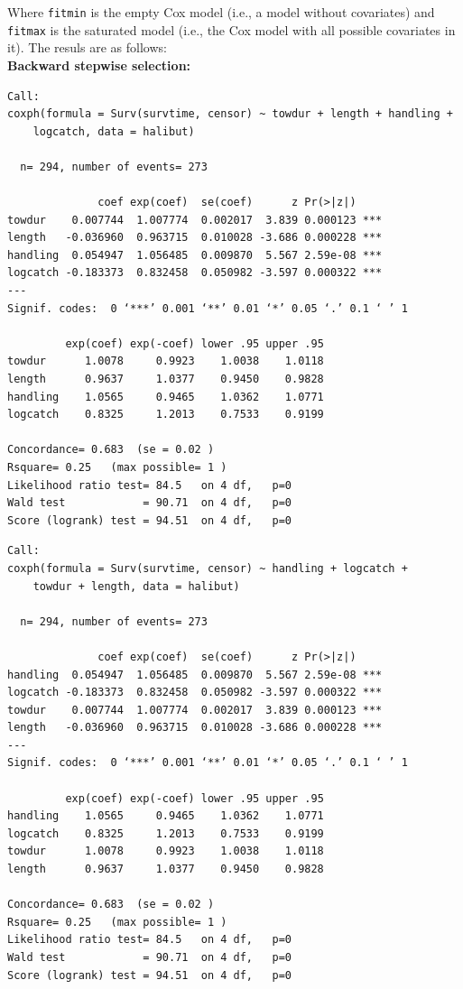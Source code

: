 \documentclass[11pt]{book}
\begin{document}
\normalsize
Where {\tt fitmin} is the empty Cox model (i.e., a model without covariates) and {\tt fitmax} is the saturated model (i.e., the Cox model with all possible covariates in it).
\noindent
The resuls are as follows:\\[2ex]
{\bf Backward stepwise selection:}
\small
\begin{verbatim}
Call:
coxph(formula = Surv(survtime, censor) ~ towdur + length + handling +
    logcatch, data = halibut)

  n= 294, number of events= 273

              coef exp(coef)  se(coef)      z Pr(>|z|)
towdur    0.007744  1.007774  0.002017  3.839 0.000123 ***
length   -0.036960  0.963715  0.010028 -3.686 0.000228 ***
handling  0.054947  1.056485  0.009870  5.567 2.59e-08 ***
logcatch -0.183373  0.832458  0.050982 -3.597 0.000322 ***
---
Signif. codes:  0 ‘***’ 0.001 ‘**’ 0.01 ‘*’ 0.05 ‘.’ 0.1 ‘ ’ 1

         exp(coef) exp(-coef) lower .95 upper .95
towdur      1.0078     0.9923    1.0038    1.0118
length      0.9637     1.0377    0.9450    0.9828
handling    1.0565     0.9465    1.0362    1.0771
logcatch    0.8325     1.2013    0.7533    0.9199

Concordance= 0.683  (se = 0.02 )
Rsquare= 0.25   (max possible= 1 )
Likelihood ratio test= 84.5   on 4 df,   p=0
Wald test            = 90.71  on 4 df,   p=0
Score (logrank) test = 94.51  on 4 df,   p=0
\end{verbatim}
\normalsize
\newpage{}
\small
\begin{verbatim}
Call:
coxph(formula = Surv(survtime, censor) ~ handling + logcatch +
    towdur + length, data = halibut)

  n= 294, number of events= 273

              coef exp(coef)  se(coef)      z Pr(>|z|)
handling  0.054947  1.056485  0.009870  5.567 2.59e-08 ***
logcatch -0.183373  0.832458  0.050982 -3.597 0.000322 ***
towdur    0.007744  1.007774  0.002017  3.839 0.000123 ***
length   -0.036960  0.963715  0.010028 -3.686 0.000228 ***
---
Signif. codes:  0 ‘***’ 0.001 ‘**’ 0.01 ‘*’ 0.05 ‘.’ 0.1 ‘ ’ 1

         exp(coef) exp(-coef) lower .95 upper .95
handling    1.0565     0.9465    1.0362    1.0771
logcatch    0.8325     1.2013    0.7533    0.9199
towdur      1.0078     0.9923    1.0038    1.0118
length      0.9637     1.0377    0.9450    0.9828

Concordance= 0.683  (se = 0.02 )
Rsquare= 0.25   (max possible= 1 )
Likelihood ratio test= 84.5   on 4 df,   p=0
Wald test            = 90.71  on 4 df,   p=0
Score (logrank) test = 94.51  on 4 df,   p=0
\end{verbatim}
\end{document}
